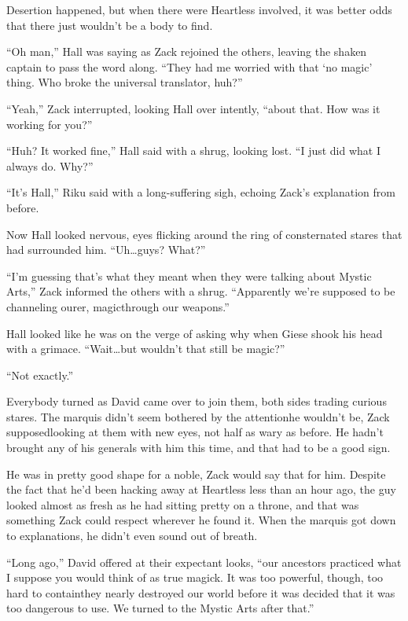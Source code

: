Desertion happened, but when there were Heartless involved, it was better odds that there just wouldn't be a body to find.

``Oh man,'' Hall was saying as Zack rejoined the others, leaving the shaken captain to pass the word along. ``They had me worried with that `no magic' thing. Who broke the universal translator, huh?''

``Yeah,'' Zack interrupted, looking Hall over intently, ``about that. How was it working for you?''

``Huh? It worked fine,'' Hall said with a shrug, looking lost. ``I just did what I always do. Why?''

``It's Hall,'' Riku said with a long-suffering sigh, echoing Zack's explanation from before.

Now Hall looked nervous, eyes flicking around the ring of consternated stares that had surrounded him. ``Uh\ldots guys? What?''

``I'm guessing that's what they meant when they were talking about Mystic Arts,'' Zack informed the others with a shrug. ``Apparently we're supposed to be channeling our\textemdash er, magic\textemdash through our weapons.''

Hall looked like he was on the verge of asking why when Giese shook his head with a grimace. ``Wait\ldots but wouldn't that still be magic?''

``Not exactly.''

Everybody turned as David came over to join them, both sides trading curious stares. The marquis didn't seem bothered by the attention\textemdash he wouldn't be, Zack supposed\textemdash looking at them with new eyes, not half as wary as before. He hadn't brought any of his generals with him this time, and that had to be a good sign.

He was in pretty good shape for a noble, Zack would say that for him. Despite the fact that he'd been hacking away at Heartless less than an hour ago, the guy looked almost as fresh as he had sitting pretty on a throne, and that was something Zack could respect wherever he found it. When the marquis got down to explanations, he didn't even sound out of breath.

``Long ago,'' David offered at their expectant looks, ``our ancestors practiced what I suppose you would think of as true magick. It was too powerful, though, too hard to contain\textemdash they nearly destroyed our world before it was decided that it was too dangerous to use. We turned to the Mystic Arts after that.''

